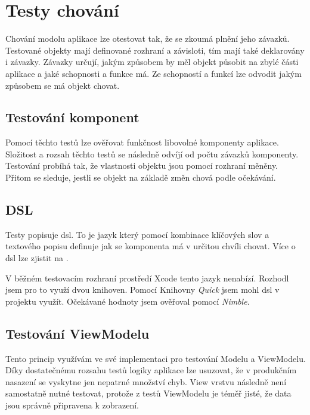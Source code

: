 \section{Testy chování}\label{testovani-bdd}

Chování modolu aplikace lze otestovat tak, že se zkoumá plnění jeho závazků.
Testované objekty mají definované rozhraní a závisloti, tím mají také deklarovány i závazky.
Závazky určují, jakým způsobem by měl objekt působit na zbylé části aplikace a jaké schopnosti a funkce má.
Ze schopností a funkcí lze odvodit jakým způsobem se má objekt chovat.

\subsection{Testování komponent}

Pomocí těchto testů lze ověřovat funkčnost libovolné komponenty aplikace.
Složitost a rozsah těchto testů se následně odvíjí od počtu závazků komponenty.
Testování probíhá tak, že vlastnosti objektu jsou pomocí rozhraní měněny.
Přitom se sleduje, jestli se objekt na základě změn chová podle očekávání. \cite{objcio-bdd}

\subsection{DSL}

Testy popisuje \acrfull{dsl}.
To je jazyk který pomocí kombinace klíčových slov a textového popisu definuje jak se komponenta má v určitou chvíli chovat.
Více o \acrshort{dsl} lze zjistit na \cite{petrikainulainen-dsl}.

V běžném testovacím rozhraní prostředí Xcode tento jazyk nenabízí.
Rozhodl jsem pro to využí dvou knihoven.
Pomocí Knihovny \textit{Quick} jsem mohl \acrshort{dsl} v projektu využít.
Očekávané hodnoty jsem ověřoval pomocí \textit{Nimble}.

\subsection{Testování ViewModelu}

Tento princip využívám ve své implementaci pro testování Modelu a ViewModelu.
Díky dostatečnému rozsahu testů logiky aplikace lze usuzovat, že v produkčním nasazení se vyskytne jen nepatrné množství chyb.
View vrstvu následně není samostatně nutné testovat, protože z testů ViewModelu je téměř jisté, že data jsou správně připravena k zobrazení.

